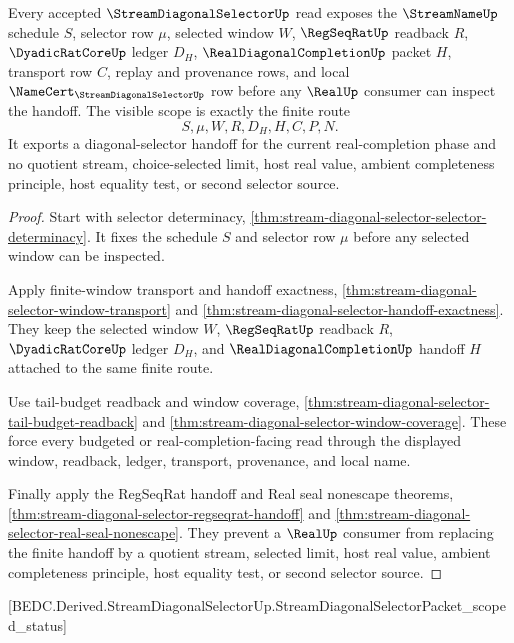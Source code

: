 \begin{theorem}
\label{thm:stream-diagonal-selector-scoped-status}
Every accepted $\StreamDiagonalSelectorUp$ read exposes the $\StreamNameUp$ schedule $S$, selector row $\mu$, selected window $W$, $\RegSeqRatUp$ readback $R$, $\DyadicRatCoreUp$ ledger $D_H$, $\RealDiagonalCompletionUp$ packet $H$, transport row $C$, replay and provenance rows, and local $\NameCert_{\StreamDiagonalSelectorUp}$ row before any $\RealUp$ consumer can inspect the handoff. The visible scope is exactly the finite route
$$
S,\mu,W,R,D_H,H,C,P,N .
$$
It exports a diagonal-selector handoff for the current real-completion phase and no quotient stream, choice-selected limit, host real value, ambient completeness principle, host equality test, or second selector source.
\end{theorem}
\begin{proof}
Start with selector determinacy, \autoref{thm:stream-diagonal-selector-selector-determinacy}. It fixes the schedule $S$ and selector row $\mu$ before any selected window can be inspected.

Apply finite-window transport and handoff exactness, \autoref{thm:stream-diagonal-selector-window-transport} and \autoref{thm:stream-diagonal-selector-handoff-exactness}. They keep the selected window $W$, $\RegSeqRatUp$ readback $R$, $\DyadicRatCoreUp$ ledger $D_H$, and $\RealDiagonalCompletionUp$ handoff $H$ attached to the same finite route.

Use tail-budget readback and window coverage, \autoref{thm:stream-diagonal-selector-tail-budget-readback} and \autoref{thm:stream-diagonal-selector-window-coverage}. These force every budgeted or real-completion-facing read through the displayed window, readback, ledger, transport, provenance, and local name.

Finally apply the RegSeqRat handoff and Real seal nonescape theorems, \autoref{thm:stream-diagonal-selector-regseqrat-handoff} and \autoref{thm:stream-diagonal-selector-real-seal-nonescape}. They prevent a $\RealUp$ consumer from replacing the finite handoff by a quotient stream, selected limit, host real value, ambient completeness principle, host equality test, or second selector source.
\end{proof}

[BEDC.Derived.StreamDiagonalSelectorUp.StreamDiagonalSelectorPacket\_scoped\_status]

